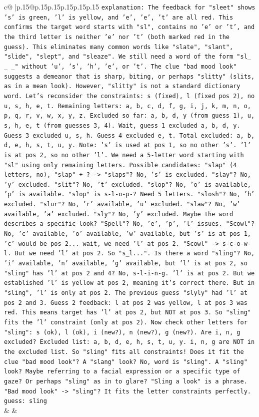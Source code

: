 \documentclass{article}
\begin{document}
{\begin{supertabular}{c@{$\;$}|p{.15\linewidth}@{}p{.15\linewidth}p{.15\linewidth}p{.15\linewidth}p{.15\linewidth}p{.15\linewidth}}
{{{                \texttt{explanation: The feedback for "sleet" shows 's' is green, 'l' is yellow, and 'e', 'e', 't' are all red. This confirms the target word starts with "sl", contains no 'e' or 't', and the third letter is neither 'e' nor 't' (both marked red in the guess). This eliminates many common words like "slate", "slant", "slide", "slept", and "sleaze". We still need a word of the form "sl\_ \_ \_" without 'u', 's', 'h', 'e', or 't'. The clue "bad mood look" suggests a demeanor that is sharp, biting, or perhaps "slitty" (slits, as in a mean look). However, "slitty" is not a standard dictionary word. Let's reconsider the constraints: s (fixed), l (fixed pos 2), no u, s, h, e, t. Remaining letters: a, b, c, d, f, g, i, j, k, m, n, o, p, q, r, v, w, x, y, z. Excluded so far: a, b, d, y (from guess 1), u, s, h, e, t (from guesses 3, 4). Wait, guess 1 excluded a, b, d, y. Guess 3 excluded u, s, h. Guess 4 excluded e, t. Total excluded: a, b, d, e, h, s, t, u, y. Note: 's' is used at pos 1, so no other 's'. 'l' is at pos 2, so no other 'l'. We need a 5{-}letter word starting with "sl" using only remaining letters. Possible candidates: "slap" (4 letters, no), "slap" + ? {-}> "slaps"? No, 's' is excluded. "slay"? No, 'y' excluded. "slit"? No, 't' excluded. "slop"? No, 'o' is available, 'p' is available. "slop" is s{-}l{-}o{-}p{-}? Need 5 letters. "slosh"? No, 'h' excluded. "slur"? No, 'r' available, 'u' excluded. "slaw"? No, 'w' available, 'a' excluded. "sly"? No, 'y' excluded. Maybe the word describes a specific look? "Spell"? No, 'e', 'p', 'l' issues. "Scowl"? No, 'c' available, 'o' available, 'w' available, but 's' is at pos 1, 'c' would be pos 2... wait, we need 'l' at pos 2. "Scowl" {-}> s{-}c{-}o{-}w{-}l. But we need 'l' at pos 2. So "s\_l...". Is there a word "sling"? No, 'i' available, 'n' available, 'g' available, but 'l' is at pos 2, so "sling" has 'l' at pos 2 and 4? No, s{-}l{-}i{-}n{-}g. 'l' is at pos 2. But we established 'l' is yellow at pos 2, meaning it's correct there. But in "sling", 'l' is only at pos 2. The previous guess "slyly" had 'l' at pos 2 and 3. Guess 2 feedback: l at pos 2 was yellow, l at pos 3 was red. This means target has 'l' at pos 2, but NOT at pos 3. So "sling" fits the 'l' constraint (only at pos 2). Now check other letters for "sling": s (ok), l (ok), i (new?), n (new?), g (new?). Are i, n, g excluded? Excluded list: a, b, d, e, h, s, t, u, y. i, n, g are NOT in the excluded list. So "sling" fits all constraints! Does it fit the clue "bad mood look"? A "slang" look? No, word is "sling". A "sling" look? Maybe referring to a facial expression or a specific type of gaze? Or perhaps "sling" as in to glare? "Sling a look" is a phrase. "Bad mood look" {-}> "sling"? It fits the letter constraints perfectly.} \\
\texttt{guess: sling} \\
            }
        }
    }
    & & \\ \\


\end{supertabular}}
\end{document}
